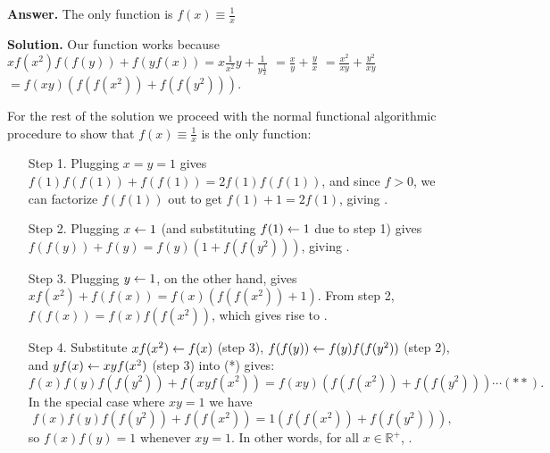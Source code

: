 \documentclass[11pt,a4paper]{article}
\begin{document}
\begin{itemize}
\textbf{Answer.} The only function is $f(x)\equiv \frac 1x$

\textbf{Solution.} 
Our function works because
$xf(x^2)f(f(y)) + f(yf(x))=x\frac1 {x^2} y+\frac 1 {y\frac 1{x}}$
$=\frac xy+\frac yx$
$=\frac{x^2}{xy}+\frac{y^2}{xy}$
$=f(xy)\left(f(f(x^2)) + f(f(y^2))\right)$. 

For the rest of the solution we proceed with the normal functional algorithmic procedure to show that $f(x)\equiv \frac 1x$ is the only function: 
\begin{itemize}
\item [Step 1.] 
Plugging $x=y=1$ gives $f(1)f(f(1))+f(f(1))=2f(1)f(f(1))$, 
and since $f>0$, we can factorize $f(f(1))$ out to get $f(1)+1=2f(1)$, giving . 

\item [Step 2.]
Plugging $x\leftarrow 1$ (and substituting $f(1)\leftarrow 1$ due to step 1) gives $f(f(y))+f(y)=f(y)(1+f(f(y^2)))$, 
giving . 

\item [Step 3.]
Plugging $y\leftarrow 1$, on the other hand, gives 
$xf(x^2)+f(f(x))=f(x)(f(f(x^2))+1)$. 
From step 2, $f(f(x))=f(x)f(f(x^2))$, 
which gives rise to . 

\item [Step 4.]
Substitute $xf(x^2)\leftarrow f(x)$ (step 3), $f(f(y))\leftarrow f(y)f(f(y^2))$ (step 2), and $yf(x)\leftarrow xyf(x^2)$ (step 3) into (*) gives: 
$$f(x)f(y)f(f(y^2)) + f(xyf(x^2)) = f(xy) \left(f(f(x^2)) + f(f(y^2))\right)\cdots(**).$$
In the special case where $xy=1$ we have \[f(x)f(y)f(f(y^2)) + f(f(x^2)) = 1 \left(f(f(x^2)) + f(f(y^2))\right),\] 
so $f(x)f(y)=1$ whenever $xy=1$. 
In other words, for all $x\in\mathbb{R}^+$, . 


\end{itemize}
\end{itemize}
\end{document}

